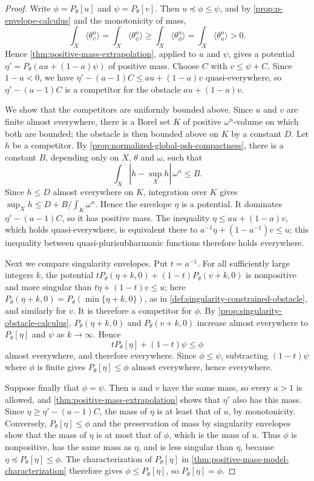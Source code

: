 \begin{proof}
Write $\phi=P_\theta[u]$ and $\psi=P_\theta[v]$. Then $u\preceq\phi\leq\psi$, and by \cref{prop:p-envelope-calculus} and the monotonicity of mass,
\[
 \int_X\langle\theta_v^n\rangle=\int_X\langle\theta_\psi^n\rangle
   \geq\int_X\langle\theta_\phi^n\rangle=\int_X\langle\theta_u^n\rangle>0.
\]
Hence \cref{thm:positive-mass-extrapolation}, applied to $u$ and $\psi$, gives a potential $\eta'=P_\theta(au+(1-a)\psi)$ of positive mass. Choose $C$ with $v\leq\psi+C$. Since $1-a<0$, we have $\eta'-(a-1)C\leq au+(1-a)v$ quasi-everywhere, so $\eta'-(a-1)C$ is a competitor for the obstacle $au+(1-a)v$.

We show that the competitors are uniformly bounded above. Since $u$ and $v$ are finite almost everywhere, there is a Borel set $K$ of positive $\omega^n$-volume on which both are bounded; the obstacle is then bounded above on $K$ by a constant $D$. Let $h$ be a competitor. By \cref{prop:normalized-global-psh-compactness}, there is a constant $B$, depending only on $X$, $\theta$ and $\omega$, such that
\[
 \int_X|h-\sup_Xh|\,\omega^n\leq B.
\]
Since $h\leq D$ almost everywhere on $K$, integration over $K$ gives $\sup_Xh\leq D+B/\int_K\omega^n$. Hence the envelope $\eta$ is a potential. It dominates $\eta'-(a-1)C$, so it has positive mass. The inequality $\eta\leq au+(1-a)v$, which holds quasi-everywhere, is equivalent there to $a^{-1}\eta+(1-a^{-1})v\leq u$; this inequality between quasi-plurisubharmonic functions therefore holds everywhere.

Next we compare singularity envelopes. Put $t=a^{-1}$. For all sufficiently large integers $k$, the potential $tP_\theta(\eta+k,0)+(1-t)P_\theta(v+k,0)$ is nonpositive and more singular than $t\eta+(1-t)v\leq u$; here $P_\theta(\eta+k,0)=P_\theta(\min\{\eta+k,0\})$, as in \cref{def:singularity-constrained-obstacle}, and similarly for $v$. It is therefore a competitor for $\phi$. By \cref{prop:singularity-obstacle-calculus}, $P_\theta(\eta+k,0)$ and $P_\theta(v+k,0)$ increase almost everywhere to $P_\theta[\eta]$ and $\psi$ as $k\to\infty$. Hence
\[
 tP_\theta[\eta]+(1-t)\psi\leq\phi
\]
almost everywhere, and therefore everywhere. Since $\phi\leq\psi$, subtracting $(1-t)\psi$ where $\phi$ is finite gives $P_\theta[\eta]\leq\phi$ almost everywhere, hence everywhere.

Suppose finally that $\phi=\psi$. Then $u$ and $v$ have the same mass, so every $a>1$ is allowed, and \cref{thm:positive-mass-extrapolation} shows that $\eta'$ also has this mass. Since $\eta\geq\eta'-(a-1)C$, the mass of $\eta$ is at least that of $u$, by monotonicity. Conversely, $P_\theta[\eta]\leq\phi$ and the preservation of mass by singularity envelopes show that the mass of $\eta$ is at most that of $\phi$, which is the mass of $u$. Thus $\phi$ is nonpositive, has the same mass as $\eta$, and is less singular than $\eta$, because $\eta\preceq P_\theta[\eta]\leq\phi$. The characterization of $P_\theta[\eta]$ in \cref{thm:positive-mass-model-characterization} therefore gives $\phi\leq P_\theta[\eta]$, so $P_\theta[\eta]=\phi$.
\end{proof}

